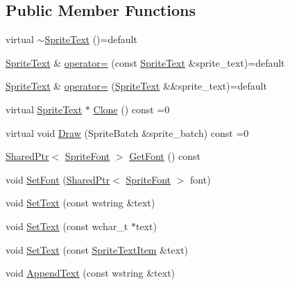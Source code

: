 \subsection*{Public Member Functions}
\begin{DoxyCompactItemize}
\item 
virtual \hyperlink{classmage_1_1_sprite_text_a0a231f260bb855b7be3280aa74a3e5c6}{$\sim$\+Sprite\+Text} ()=default
\item 
\hyperlink{classmage_1_1_sprite_text}{Sprite\+Text} \& \hyperlink{classmage_1_1_sprite_text_ad9bdf1d36eab783d2f742f32c464aa0b}{operator=} (const \hyperlink{classmage_1_1_sprite_text}{Sprite\+Text} \&sprite\+\_\+text)=default
\item 
\hyperlink{classmage_1_1_sprite_text}{Sprite\+Text} \& \hyperlink{classmage_1_1_sprite_text_a48e9d2fdda8bf2f8847a425444df980c}{operator=} (\hyperlink{classmage_1_1_sprite_text}{Sprite\+Text} \&\&sprite\+\_\+text)=default
\item 
virtual \hyperlink{classmage_1_1_sprite_text}{Sprite\+Text} $\ast$ \hyperlink{classmage_1_1_sprite_text_ac4edf927911a9fb8e5c3a674b217637a}{Clone} () const =0
\item 
virtual void \hyperlink{classmage_1_1_sprite_text_a45d5ac8410d5a46b26e8491946a2ad9e}{Draw} (Sprite\+Batch \&sprite\+\_\+batch) const =0
\item 
\hyperlink{namespacemage_a1e01ae66713838a7a67d30e44c67703e}{Shared\+Ptr}$<$ \hyperlink{classmage_1_1_sprite_font}{Sprite\+Font} $>$ \hyperlink{classmage_1_1_sprite_text_a1c80933525f87fe4dced9479c1b79764}{Get\+Font} () const
\item 
void \hyperlink{classmage_1_1_sprite_text_a8e753dcd210b1fdf9c5399a9f0f3415d}{Set\+Font} (\hyperlink{namespacemage_a1e01ae66713838a7a67d30e44c67703e}{Shared\+Ptr}$<$ \hyperlink{classmage_1_1_sprite_font}{Sprite\+Font} $>$ font)
\item 
void \hyperlink{classmage_1_1_sprite_text_ac33e512ab29554a306ada9a378ab00eb}{Set\+Text} (const wstring \&text)
\item 
void \hyperlink{classmage_1_1_sprite_text_a03d5012e2812d422a1285a4a0abb104f}{Set\+Text} (const wchar\+\_\+t $\ast$text)
\item 
void \hyperlink{classmage_1_1_sprite_text_ab9f28cf44b29b8489794938a8965f104}{Set\+Text} (const \hyperlink{structmage_1_1_sprite_text_item}{Sprite\+Text\+Item} \&text)
\item 
void \hyperlink{classmage_1_1_sprite_text_acf993532a7b2e6ebb761b9b47cbdba98}{Append\+Text} (const wstring \&text)
\item 

\end{DoxyCompactItemize}
